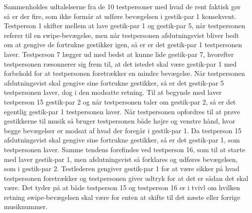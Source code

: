 Sammenholdes udtalelserne fra de 10 testpersoner med hvad de rent faktisk gør så er der fire, som ikke formår at udføre bevægelsen i gestik-par 1 konsekvent. Testperson 1 skifter mellem at lave gestik-par 1 og gestik-par 5, når testpersonen referer til en swipe-bevægelse, men når testpersonen afslutningsvist bliver bedt om at gengive de fortrukne gestikker igen, så er er det gestik-par 1 testpersonen laver. Testperson 7 lægger ud med bedst at kunne lide gestik-par 7, hvorefter testpersonen ræsonnerer sig frem til, at det istedet skal være gestik-par 1 med forbehold for at testpersonen foretrækker en mindre bevægelse. Når testpersonen afslutningsvist skal gengive sine fortrukne gestikker, så er det gestik-par 5 testpersonen laver, dog i den modsatte retning. Til at begynde med laver testperson 15 gestik-par 2 og når testpersonen taler om gestik-par 2, så er det egentlig gestik-par 1 testpersonen laver. Når testpersonen opfordres til at prøve gestikkerne til musik så bruger testpersonen både højre og venstre hånd, hvor begge bevægelser er modsat af hvad der foregår i gestik-par 1. Da testperson 15 afslutningsvist skal gengive sine fortrukne gestikker, så er det gestik-par 1, som testpersonen laver. Samme tendens forefindes ved testperson 16, som til at starte med laver gestik-par 1, men afslutningsvist så forklares og udføres bevægelsen, som i gestik-par 2. Testlederen gengiver gestik-par 1 for at være sikker på hvad testpersonen foretrækker og testpersonen giver udtryk for at det er sådan det skal være. Det tyder på at både testperson 15 og testperson 16 er i tvivl om hvilken retning swipe-bevægelsen skal være for enten at skifte til det næste eller forrige musiknummer. 

